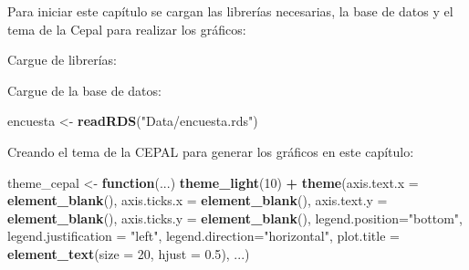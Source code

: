 \documentclass[
  spanish,
  12pt,
]{book}
\newenvironment{Shaded}{\begin{snugshade}}{\end{snugshade}}
\newcommand{\AttributeTok}[1]{\textcolor[rgb]{0.13,0.29,0.53}{#1}}
\newcommand{\ConstantTok}[1]{\textcolor[rgb]{0.56,0.35,0.01}{#1}}
\newcommand{\ControlFlowTok}[1]{\textcolor[rgb]{0.13,0.29,0.53}{\textbf{#1}}}
\newcommand{\DecValTok}[1]{\textcolor[rgb]{0.00,0.00,0.81}{#1}}
\newcommand{\FloatTok}[1]{\textcolor[rgb]{0.00,0.00,0.81}{#1}}
\newcommand{\FunctionTok}[1]{\textcolor[rgb]{0.13,0.29,0.53}{\textbf{#1}}}
\newcommand{\NormalTok}[1]{#1}
\newcommand{\OtherTok}[1]{\textcolor[rgb]{0.56,0.35,0.01}{#1}}
\newcommand{\SpecialCharTok}[1]{\textcolor[rgb]{0.81,0.36,0.00}{\textbf{#1}}}
\newcommand{\StringTok}[1]{\textcolor[rgb]{0.31,0.60,0.02}{#1}}
\begin{document}
Para iniciar este capítulo se cargan las librerías necesarias, la base de datos y el tema de la Cepal para realizar los gráficos:

Cargue de librerías:

\begin{Shaded}
\end{Shaded}

Cargue de la base de datos:

\begin{Shaded}
\begin{Highlighting}[]
\NormalTok{encuesta }\OtherTok{\textless{}{-}} \FunctionTok{readRDS}\NormalTok{(}\StringTok{"Data/encuesta.rds"}\NormalTok{) }
\end{Highlighting}
\end{Shaded}

Creando el tema de la CEPAL para generar los gráficos en este capítulo:

\begin{Shaded}
\begin{Highlighting}[]
\NormalTok{theme\_cepal }\OtherTok{\textless{}{-}} \ControlFlowTok{function}\NormalTok{(...) }\FunctionTok{theme\_light}\NormalTok{(}\DecValTok{10}\NormalTok{) }\SpecialCharTok{+} 
  \FunctionTok{theme}\NormalTok{(}\AttributeTok{axis.text.x =} \FunctionTok{element\_blank}\NormalTok{(),}
        \AttributeTok{axis.ticks.x =} \FunctionTok{element\_blank}\NormalTok{(),}
        \AttributeTok{axis.text.y =} \FunctionTok{element\_blank}\NormalTok{(),}
        \AttributeTok{axis.ticks.y =} \FunctionTok{element\_blank}\NormalTok{(),}
        \AttributeTok{legend.position=}\StringTok{"bottom"}\NormalTok{, }
        \AttributeTok{legend.justification =} \StringTok{"left"}\NormalTok{, }
        \AttributeTok{legend.direction=}\StringTok{"horizontal"}\NormalTok{,}
        \AttributeTok{plot.title =} \FunctionTok{element\_text}\NormalTok{(}\AttributeTok{size =} \DecValTok{20}\NormalTok{, }\AttributeTok{hjust =} \FloatTok{0.5}\NormalTok{),}
\NormalTok{        ...) }
\end{Highlighting}
\end{Shaded}
\end{document}

